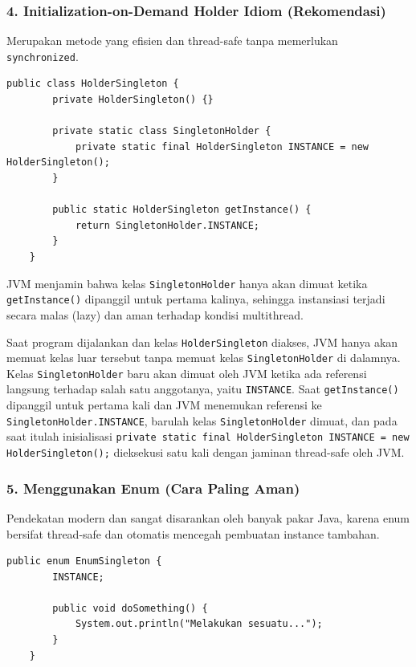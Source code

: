 \subsubsection*{4. Initialization-on-Demand Holder Idiom (Rekomendasi)}

Merupakan metode yang efisien dan thread-safe tanpa memerlukan \texttt{synchronized}.

\begin{lstlisting}[style=JavaStyle]
	public class HolderSingleton {
		private HolderSingleton() {}
		
		private static class SingletonHolder {
			private static final HolderSingleton INSTANCE = new HolderSingleton();
		}
		
		public static HolderSingleton getInstance() {
			return SingletonHolder.INSTANCE;
		}
	}
\end{lstlisting}

JVM menjamin bahwa kelas \texttt{SingletonHolder} hanya akan dimuat ketika \texttt{getInstance()} dipanggil untuk pertama kalinya, sehingga instansiasi terjadi secara malas (lazy) dan aman terhadap kondisi multithread.

Saat program dijalankan dan kelas \texttt{HolderSingleton} diakses, JVM hanya akan memuat kelas luar tersebut tanpa memuat kelas \texttt{SingletonHolder} di dalamnya. Kelas \texttt{SingletonHolder} baru akan dimuat oleh JVM ketika ada referensi langsung terhadap salah satu anggotanya, yaitu \texttt{INSTANCE}. Saat \texttt{getInstance()} dipanggil untuk pertama kali dan JVM menemukan referensi ke \texttt{SingletonHolder.INSTANCE}, barulah kelas \texttt{SingletonHolder} dimuat, dan pada saat itulah inisialisasi \texttt{private static final HolderSingleton INSTANCE = new HolderSingleton();} dieksekusi satu kali dengan jaminan thread-safe oleh JVM.


\subsubsection*{5. Menggunakan Enum (Cara Paling Aman)}

Pendekatan modern dan sangat disarankan oleh banyak pakar Java, karena enum bersifat thread-safe dan otomatis mencegah pembuatan instance tambahan.

\begin{lstlisting}[style=JavaStyle]
	public enum EnumSingleton {
		INSTANCE;
		
		public void doSomething() {
			System.out.println("Melakukan sesuatu...");
		}
	}
\end{lstlisting}

